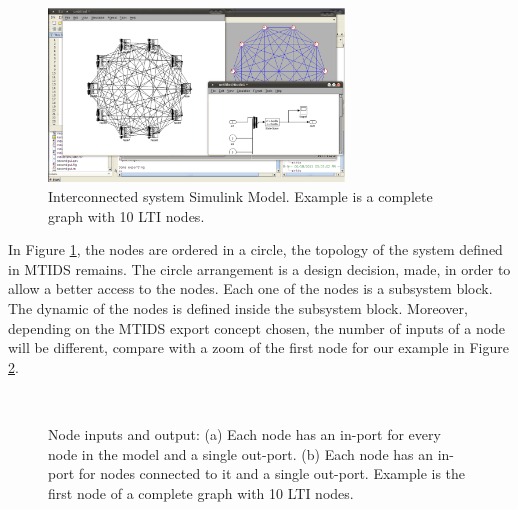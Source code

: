 \documentclass[a4paper,twoside, openright,12pt]{report}
\begin{document}
\begin{figure}[htb]
\centering
\includegraphics[width=0.7\textwidth]{pics/screenExportResult.eps}
\caption[MTIDS exported Simulink model]{Interconnected system Simulink Model. Example is a complete graph with 10 LTI nodes. }
\label{exportFig}
\end{figure}

In Figure \ref{exportFig}, the nodes are ordered in a circle, the topology of the system defined in MTIDS remains. The circle arrangement is a 
design decision, made, in order to allow a better access to the nodes. Each one of the nodes is a subsystem block. The dynamic of the nodes is defined inside
the subsystem block. Moreover, depending on the MTIDS export concept chosen, the number of inputs of a node will be different, compare with a zoom 
of the first node for our example in Figure \ref{nodeFig}. \\
 
\begin{figure}[htb]
\centering
\mbox{\quad
{}}
\caption[MTIDS node in Simulink]{Node inputs and output: (a) Each node has an in-port for every node in the model and a single out-port. 
(b) Each node has an in-port for nodes connected to it and a single out-port. Example is the first node of a complete graph with 10 LTI nodes. }
\label{nodeFig}
\end{figure}
\end{document}
